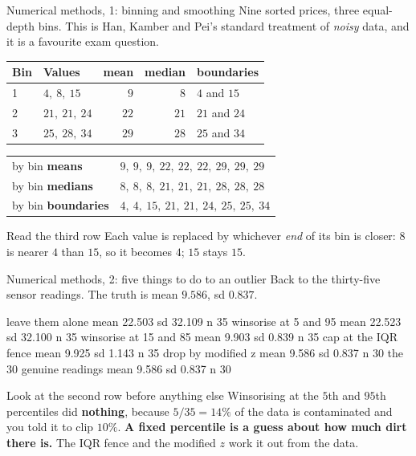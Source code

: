 \documentclass[aspectratio=169]{beamer}
\begin{document}
\begin{frame}[shrink=6]{Numerical methods, 1: binning and smoothing}
  Nine sorted prices, three equal-depth bins. This is Han, Kamber and Pei's
  standard treatment of \emph{noisy} data, and it is a favourite exam question.
  \begin{center}\small
  \begin{tabular}{@{}llrrl@{}}
    \toprule
    Bin & Values & mean & median & boundaries\\
    \midrule
    1 & $4,\ 8,\ 15$   & $9$  & $8$  & $4$ and $15$\\
    2 & $21,\ 21,\ 24$ & $22$ & $21$ & $21$ and $24$\\
    3 & $25,\ 28,\ 34$ & $29$ & $28$ & $25$ and $34$\\
    \bottomrule
  \end{tabular}
  \end{center}
  \vspace{0.2em}
  \begin{center}\small
  \begin{tabular}{@{}ll@{}}
    \toprule
    by bin \textbf{means}      & $9,\ 9,\ 9,\ 22,\ 22,\ 22,\ 29,\ 29,\ 29$\\
    by bin \textbf{medians}    & $8,\ 8,\ 8,\ 21,\ 21,\ 21,\ 28,\ 28,\ 28$\\
    by bin \textbf{boundaries} & $4,\ 4,\ 15,\ 21,\ 21,\ 24,\ 25,\ 25,\ 34$\\
    \bottomrule
  \end{tabular}
  \end{center}
  \vspace{0.2em}
  \begin{block}{Read the third row}
    \small Each value is replaced by whichever \emph{end} of its bin is closer:
    $8$ is nearer $4$ than $15$, so it becomes $4$; $15$ stays $15$.
  \end{block}
\end{frame}

\begin{frame}[fragile,shrink=6]{Numerical methods, 2: five things to do to an outlier}
Back to the thirty-five sensor readings. The truth is mean $9.586$,
sd $0.837$.
\begin{outblk}
  leave them alone         mean  22.503   sd  32.109   n 35
  winsorise at 5 and 95    mean  22.523   sd  32.100   n 35
  winsorise at 15 and 85   mean   9.903   sd   0.839   n 35
  cap at the IQR fence     mean   9.925   sd   1.143   n 35
  drop by modified z       mean   9.586   sd   0.837   n 30
  the 30 genuine readings  mean   9.586   sd   0.837   n 30
\end{outblk}
\begin{alertblock}{Look at the second row before anything else}
  \footnotesize Winsorising at the $5$th and $95$th percentiles did
  \textbf{nothing}, because $5/35 = 14\%$ of the data is contaminated and you
  told it to clip $10\%$. \textbf{A fixed percentile is a guess about how much
  dirt there is.} The IQR fence and the modified $z$ work it out from the data.
\end{alertblock}
\end{frame}
\end{document}

